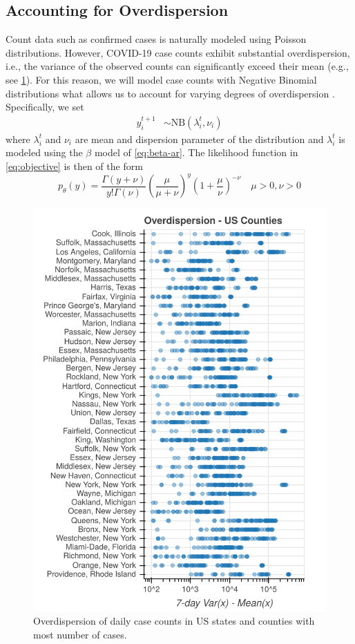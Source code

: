 \documentclass{article}
\newcommand{\bAR}{\ensuremath{\beta}\text{-AR}\xspace}
\newcommand{\foi}{\lambda}
\begin{document}
\subsection{Accounting for Overdispersion}
\label{sec:org2abffde}
Count data such as confirmed cases is naturally modeled using Poisson
distributions. However, COVID-19 case counts exhibit substantial overdispersion,
i.e., the variance of the observed counts can significantly exceed their mean
(e.g., see \cref{fig:dispersion}). For this
reason, we will model case counts with Negative Binomial distributions what
allows us to account for varying degrees of overdispersion \citep{lloyd_smith2007negativebinomial}. Specifically, we set
\begin{align*}
    y^{t+1}_{i} & \sim \text{NB}(\foi_i^{t}, \nu_i)
\end{align*}
where \(\foi^t_i\) and \(\nu_i\) are mean and dispersion parameter of the
distribution and \(\foi^t_i\) is modeled using the \bAR model of \cref{eq:beta-ar}. The
likelihood function in \cref{eq:objective} is then of the form
\begin{equation*}
p_\theta(y) = \frac{\Gamma(y + \nu)}{y!\Gamma(\nu)}\left(\frac{\mu}{\mu +\nu}\right)^{y}\left(1 + \frac{\mu}{\nu}\right)^{-\nu}
\quad \mu > 0, \nu > 0
\end{equation*}

\begin{figure}[t]
  \centering
\includegraphics[width=.8\columnwidth]{img/overdispersion_counties.png}
\caption{Overdispersion of daily case counts in US states and counties with most number of cases.}
\label{fig:dispersion}
\end{figure}
\end{document}
